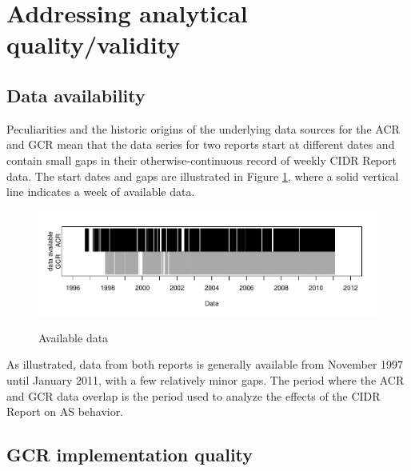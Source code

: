 \section{Addressing analytical quality/validity}

\subsection{Data availability}
Peculiarities and the historic origins of the underlying data sources for the
ACR and GCR mean that the data series for two reports start at different dates
and contain small gaps in their otherwise-continuous record of weekly CIDR
Report data. The start dates and gaps are illustrated in Figure
\ref{fig:avail_data}, where a solid vertical line indicates a week of available
data.

\begin{figure}[h!]
\begin{centering}
\begin{singlespace}
    \includegraphics[width=6in]{figures/data_avail.pdf}
    \vspace{-2em}\\
    \caption{Available data}
    \label{fig:avail_data}
\end{singlespace}
\end{centering}
\end{figure}

As illustrated, data from both reports is generally available from November 1997
until January 2011, with a few relatively minor gaps. The period where the ACR
and GCR data overlap is the period used to analyze the effects of the CIDR
Report on AS behavior.


\subsection{GCR implementation quality}


